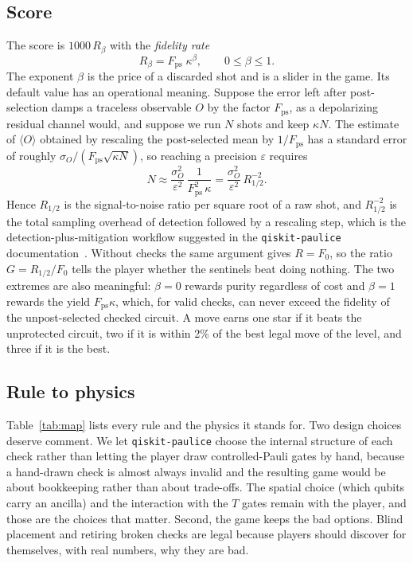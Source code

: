 \subsection{Score}
\label{sec:score}
The score is $1000\,R_\beta$ with the \emph{fidelity rate}
\begin{equation}
  R_\beta = F_{\mathrm{ps}}\;\kappa^{\beta}, \qquad 0\le\beta\le1 .
  \label{eq:rate}
\end{equation}
The exponent $\beta$ is the price of a discarded shot and is a slider in the game. Its default value has an operational meaning. Suppose the error left after post-selection damps a traceless observable $O$ by the factor $F_{\mathrm{ps}}$, as a depolarizing residual channel would, and suppose we run $N$ shots and keep $\kappa N$. The estimate of $\langle O\rangle$ obtained by rescaling the post-selected mean by $1/F_{\mathrm{ps}}$ has a standard error of roughly $\sigma_O/(F_{\mathrm{ps}}\sqrt{\kappa N})$, so reaching a precision $\varepsilon$ requires
\begin{equation}
  N \approx \frac{\sigma_O^2}{\varepsilon^2}\,\frac{1}{F_{\mathrm{ps}}^2\,\kappa}=\frac{\sigma_O^2}{\varepsilon^2}\,R_{1/2}^{-2}.
\end{equation}
Hence $R_{1/2}$ is the signal-to-noise ratio per square root of a raw shot, and $R_{1/2}^{-2}$ is the total sampling overhead of detection followed by a rescaling step, which is the detection-plus-mitigation workflow suggested in the \texttt{qiskit-paulice} documentation~\cite{paulice}. Without checks the same argument gives $R=F_0$, so the ratio $G=R_{1/2}/F_0$ tells the player whether the sentinels beat doing nothing. The two extremes are also meaningful: $\beta=0$ rewards purity regardless of cost and $\beta=1$ rewards the yield $F_{\mathrm{ps}}\kappa$, which, for valid checks, can never exceed the fidelity of the unpost-selected checked circuit. A move earns one star if it beats the unprotected circuit, two if it is within 2\% of the best legal move of the level, and three if it is the best.

\subsection{Rule to physics}
Table~\ref{tab:map} lists every rule and the physics it stands for. Two design choices deserve comment. We let \texttt{qiskit-paulice} choose the internal structure of each check rather than letting the player draw controlled-Pauli gates by hand, because a hand-drawn check is almost always invalid and the resulting game would be about bookkeeping rather than about trade-offs. The spatial choice (which qubits carry an ancilla) and the interaction with the $T$ gates remain with the player, and those are the choices that matter. Second, the game keeps the bad options. Blind placement and retiring broken checks are legal because players should discover for themselves, with real numbers, why they are bad.

